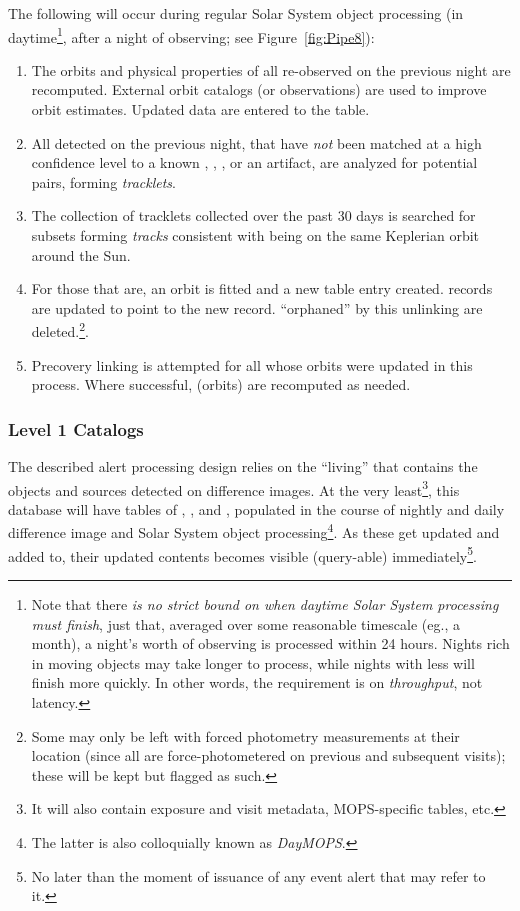 The following will occur during regular Solar System object processing (in daytime\footnote{Note that there {\em is no strict bound on when daytime Solar System processing must finish}, just that, averaged over some reasonable timescale (eg., a month), a night's worth of observing is processed within 24 hours. Nights rich in moving objects may take longer to process, while nights with less will finish more quickly. In other words, the requirement is on {\em throughput}, not latency.}, after a night of observing; see Figure~\ref{fig:Pipe8}):
\begin{enumerate}
\item The orbits and physical properties of all \SSObjects re-observed on the previous night are recomputed. External orbit catalogs (or observations) are used to improve orbit estimates. Updated data are entered to the \SSObjects table. 
\item All \DIASources detected on the previous night, that have {\em not} been matched at a high confidence level to a known \Object,
\DIAObject, \SSObject, or an artifact, are analyzed for potential pairs, forming {\em tracklets}.
\item The collection of tracklets collected over the past 30 days is searched for subsets forming {\em tracks} consistent with being on the same Keplerian orbit around the Sun.
\item For those that are, an orbit is fitted and a new \SSObject table entry created. \DIASource records are updated to point to the new \SSObject record. \DIAObjects ``orphaned'' by this unlinking are deleted.\footnote{Some \DIAObjects may only be left with forced photometry measurements at their location (since all \DIAObjects are force-photometered on previous and subsequent visits);  these will be kept but flagged as such.}.
\item Precovery linking is attempted for all \SSObjects whose orbits were updated in this process. Where successful, \SSObjects (orbits) are recomputed as needed.
\end{enumerate}


\subsubsection{Level 1 Catalogs}
\label{sec:level1db}

The described alert processing design relies on the ``living'' \DB that contains the objects and sources detected on difference images. At the very least\footnote{It will also contain exposure and visit metadata, MOPS-specific tables, etc.}, this database will have tables of \DIASources, \DIAObjects, and \SSObjects, populated in the course of nightly and daily difference image and Solar System object processing\footnote{The latter is also colloquially known as {\em DayMOPS}.}. As these get updated and added to, their updated contents becomes visible (query-able) immediately\footnote{No later than the moment of issuance of any event alert that may refer to it.}.

